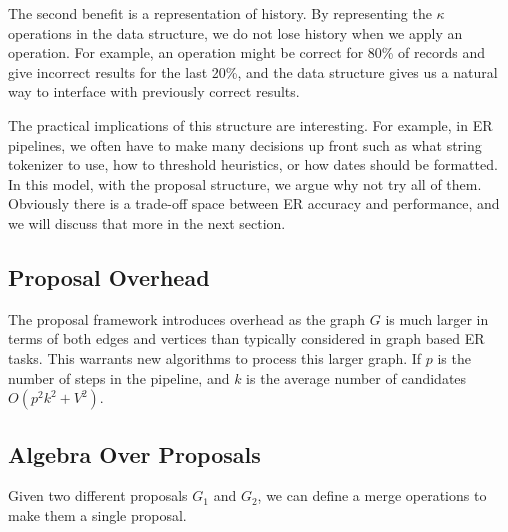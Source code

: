 The second benefit is a representation of history. 
By representing the $\kappa$ operations in the data structure, we do not lose history when we apply an operation.
For example, an operation might be correct for 80\% of records and give incorrect results for the last 20\%, and the data structure gives us a natural way to interface with previously correct results.

The practical implications of this structure are interesting. 
For example, in ER pipelines, we often have to make many decisions up front such as what string tokenizer to use, how to threshold heuristics, or how dates should be formatted.
In this model, with the proposal structure, we argue why not try all of them.
Obviously there is a trade-off space between ER accuracy and performance, and we will discuss that more in the next section.

\subsection{Proposal Overhead}
The proposal framework introduces overhead as the graph $G$ is much larger in terms of both edges and vertices than typically considered in graph based ER tasks. 
This warrants new algorithms to process this larger graph.
If $p$ is the number of steps in the pipeline, and $k$ is the average number of candidates $O(p^2k^2+V^2)$.

\subsection{Algebra Over Proposals}
Given two different proposals $G_1$ and $G_2$, we can define a merge operations to make them a single proposal.

